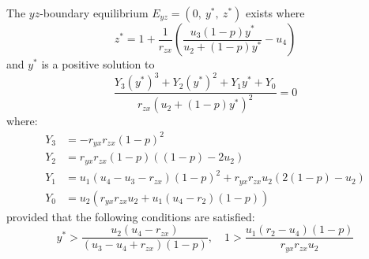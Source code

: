 \begin{theorem}\label{thm:boundary-yz-exist}
    The $yz$-boundary equilibrium $E_{yz}=\left(0,\ y^*,\ z^*\right)$ exists where
    \begin{equation*}
        z^*=1+\frac{1}{r_{zx}}\left(\frac{u_3\left(1-p\right)y^*}{u_2+\left(1-p\right)y^*}-u_4\right)
    \end{equation*}
    and $y^*$ is a positive solution to 
    \begin{equation*}
        \frac{Y_3\left(y^*\right)^3+Y_2\left(y^*\right)^2+Y_1y^*+Y_0}{r_{zx}\left(u_2+\left(1-p\right)y^*\right)^2}=0
    \end{equation*}
    where:
    \begin{align*}
        Y_3 &= -r_{yx}r_{zx}\left(1-p\right)^2\\
        Y_2 &= r_{yx}r_{zx}\left(1-p\right)\left(\left(1-p\right)-2u_2\right)\\
        Y_1 &= u_1\left(u_4-u_3-r_{zx}\right)\left(1-p\right)^2+r_{yx}r_{zx}u_2\left(2\left(1-p\right)-u_2\right)\\
        Y_0 &= u_2\left(r_{yx}r_{zx}u_2+u_1\left(u_4-r_2\right)\left(1-p\right)\right)
    \end{align*}
    provided that the following conditions are satisfied:
    \begin{equation*}
        y^* > \frac{u_2\left(u_4-r_{zx}\right)}{\left(u_3-u_4+r_{zx}\right)\left(1-p\right)},\quad 
        1 > \frac{u_1\left(r_2-u_4\right)\left(1-p\right)}{r_{yx}r_{zx}u_2}
    \end{equation*}
\end{theorem}
